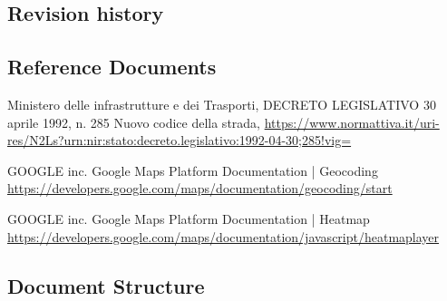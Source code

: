 \subsection{Revision history}


\subsection{Reference Documents}
\begin{thebibliography}{00}

 Ministero delle infrastrutture e dei Trasporti, DECRETO LEGISLATIVO 30 aprile 1992, n. 285 Nuovo codice della strada, \url{https://www.normattiva.it/uri-res/N2Ls?urn:nir:stato:decreto.legislativo:1992-04-30;285!vig=}

 GOOGLE inc. Google Maps Platform Documentation | Geocoding \url{https://developers.google.com/maps/documentation/geocoding/start}

 GOOGLE inc. Google Maps Platform Documentation | Heatmap \url{https://developers.google.com/maps/documentation/javascript/heatmaplayer}



\end{thebibliography}


\subsection{Document Structure}
